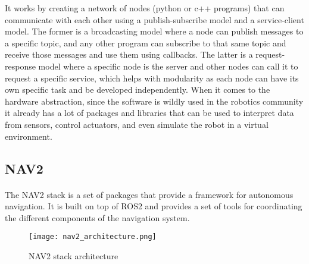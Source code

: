 It works by creating a network of nodes (python or c++ programs) that can communicate with each other 
using a publish-subscribe model and a service-client model. The former is a broadcasting 
model where a node can publish messages to a specific topic, and any other 
program can subscribe to that same topic and receive those messages and use them using callbacks. 
The latter is a request-response model where a specific node is the server and other 
nodes can call it to request a specific service, which helps with modularity 
as each node can have its own specific task and be developed independently. When it comes to 
the hardware abstraction, since the software is wildly used in the robotics community 
it already has a lot of packages and libraries that can be used to interpret data from 
sensors, control actuators, and even simulate the robot in a virtual environment.


\subsection{NAV2}
\label{subsec:navigation2}
\paragraph{}The \gls{NAV2} stack is a set of packages that provide a framework for autonomous navigation. 
It is built on top of \gls{ROS2} and provides a set of tools for coordinating the different components of 
the navigation system.
\begin{figure}[h]
    \centering
    \texttt{[image: nav2\_architecture.png]}
    \caption{NAV2 stack architecture \cite{nav2_architecture}}
    \label{fig:nav2_stack}
\end{figure}

